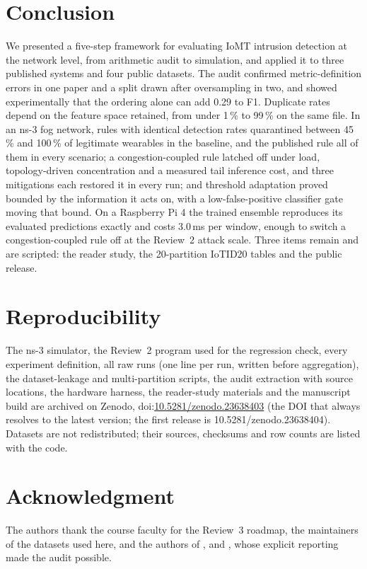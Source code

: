 \section{Conclusion}\label{sec:conclusion}
\noindent We presented a five-step framework for evaluating IoMT intrusion detection at the network level, from arithmetic audit to simulation, and applied it to three published systems and four public datasets. The audit confirmed metric-definition errors in one paper and a split drawn after oversampling in two, and showed experimentally that the ordering alone can add 0.29 to F1. Duplicate rates depend on the feature space retained, from under 1\,\% to 99\,\% on the same file. In an ns-3 fog network, rules with identical detection rates quarantined between 45\,\% and 100\,\% of legitimate wearables in the baseline, and the published rule all of them in every scenario; a congestion-coupled rule latched off under load, topology-driven concentration and a measured tail inference cost, and three mitigations each restored it in every run; and threshold adaptation proved bounded by the information it acts on, with a low-false-positive classifier gate moving that bound. On a Raspberry Pi 4 the trained ensemble reproduces its evaluated predictions exactly and costs 3.0\,ms per window, enough to switch a congestion-coupled rule off at the Review~2 attack scale. Three items remain and are scripted: the reader study, the 20-partition IoTID20 tables and the public release.

\section*{Reproducibility}\label{sec:repro}
\noindent The ns-3 simulator, the Review~2 program used for the regression check, every experiment definition, all raw runs (one line per run, written before aggregation), the dataset-leakage and multi-partition scripts, the audit extraction with source locations, the hardware harness, the reader-study materials and the manuscript build are archived on Zenodo, doi:\href{https://doi.org/10.5281/zenodo.23638403}{10.5281/zenodo.23638403} (the DOI that always resolves to the latest version; the first release is 10.5281/zenodo.23638404). Datasets are not redistributed; their sources, checksums and row counts are listed with the code.

\section*{Acknowledgment}
\noindent The authors thank the course faculty for the Review~3 roadmap, the maintainers of the datasets used here, and the authors of \cite{berguiga2025}, \cite{hosain2025} and \cite{tarish2026}, whose explicit reporting made the audit possible.
